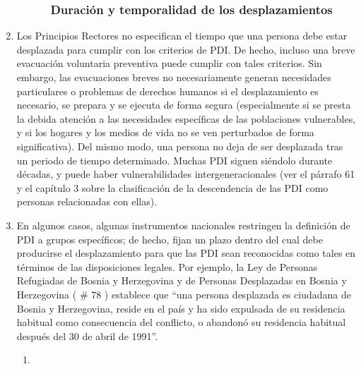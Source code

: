 \documentclass[
]{book}
\begin{document}
\begin{enumerate}
\begin{enumerate}
\begin{enumerate}
{      \subsubsection{Duración y temporalidad de los desplazamientos}\label{duraciuxf3n-y-temporalidad-de-los-desplazamientos}}
    \end{enumerate}
  \end{enumerate}
\item
  Los Principios Rectores no especifican el tiempo que una persona debe estar desplazada para cumplir con los criterios de PDI. De hecho, incluso una breve evacuación voluntaria preventiva puede cumplir con tales criterios. Sin embargo, las evacuaciones breves no necesariamente generan necesidades particulares o problemas de derechos humanos si el desplazamiento es necesario, se prepara y se ejecuta de forma segura (especialmente si se presta la debida atención a las necesidades específicas de las poblaciones vulnerables, y si los hogares y los medios de vida no se ven perturbados de forma significativa). Del mismo modo, una persona no deja de ser desplazada tras un periodo de tiempo determinado. Muchas PDI siguen siéndolo durante décadas, y puede haber vulnerabilidades intergeneracionales (ver el párrafo 61 y el capítulo 3 sobre la clasificación de la descendencia de las PDI como personas relacionadas con ellas).
\item
  En algunos casos, algunas instrumentos nacionales restringen la definición de PDI a grupos específicos; de hecho, fijan un plazo dentro del cual debe producirse el desplazamiento para que las PDI sean reconocidas como tales en términos de las disposiciones legales. Por ejemplo, la Ley de Personas Refugiadas de Bosnia y Herzegovina y de Personas Desplazadas en Bosnia y Herzegovina (
  \# 78
  ) establece que ``una persona desplazada es ciudadana de Bosnia y Herzegovina, reside en el país y ha sido expulsada de su residencia habitual como consecuencia del conflicto, o abandonó su residencia habitual después del 30 de abril de 1991''.

  \begin{enumerate}
  \def\labelenumii{\arabic{enumii}.}
  \item ~
    \hypertarget{descendencia-de-las-pdi}{%
}
\end{enumerate}
\end{enumerate}
\end{document}
